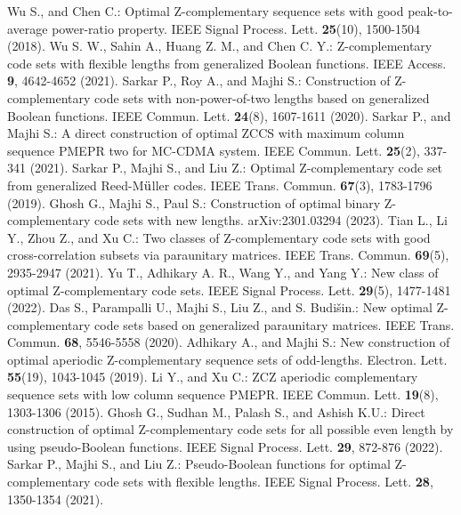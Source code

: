 \documentclass[11pt]{article}
\newcommand{\2} {$2$-to-$1$}
\begin{document}
\begin{thebibliography}{1}
	Wu S.,  and Chen C.:  Optimal Z-complementary sequence sets with good peak-to-average power-ratio property. IEEE Signal Process. Lett. \textbf{25}(10), 1500-1504 (2018).
 Wu S. W., Sahin A., Huang Z. M., and  Chen C. Y.: Z-complementary code sets with flexible lengths from generalized Boolean functions. IEEE Access. \textbf{9},  4642-4652 (2021).
	Sarkar P., Roy A., and Majhi S.: Construction of Z-complementary code sets with non-power-of-two lengths based on generalized Boolean functions. IEEE Commun. Lett. \textbf{24}(8), 1607-1611 (2020).
	Sarkar P.,  and Majhi S.: A direct construction of optimal ZCCS with maximum column sequence PMEPR two for MC-CDMA system. IEEE Commun. Lett.  \textbf{25}(2),  337-341 (2021).
	Sarkar P., Majhi S.,  and Liu Z.: Optimal Z-complementary code set from generalized Reed-M$\rm\ddot{u}$ller codes. IEEE Trans. Commun. \textbf{67}(3), 1783-1796 (2019).
  Ghosh G., Majhi S., Paul S.: Construction of optimal binary Z-complementary code sets with new lengths.  arXiv:2301.03294 (2023).
 Tian L., Li Y., Zhou Z., and Xu C.:  Two classes of Z-complementary code sets with good cross-correlation subsets via paraunitary matrices. IEEE Trans. Commun.  \textbf{69}(5),  2935-2947  (2021).
 Yu T., Adhikary A. R., Wang Y., and Yang Y.:  New class of optimal Z-complementary code sets. IEEE Signal Process. Lett. \textbf{29}(5),  1477-1481  (2022).
 	Das S., Parampalli U., Majhi S., Liu Z.,  and S. Budi\v{s}in.:  New optimal Z-complementary code sets based on generalized paraunitary matrices. IEEE Trans. Commun.  \textbf{68},  5546-5558 (2020).
 Adhikary A.,  and Majhi S.:  New construction of optimal aperiodic Z-complementary sequence sets of odd-lengths. Electron. Lett. \textbf{55}(19),  1043-1045 (2019).
 Li Y.,  and Xu C.: ZCZ aperiodic complementary sequence sets with low column sequence PMEPR. IEEE Commun. Lett.  \textbf{19}(8), 1303-1306 (2015).
  Ghosh G., Sudhan M., Palash S., and Ashish K.U.: Direct construction of optimal Z-complementary code sets for all possible even length by using pseudo-Boolean functions. IEEE Signal Process. Lett. \textbf{29},  872-876  (2022). 
  Sarkar P., Majhi S., and Liu Z.: Pseudo-Boolean functions for optimal Z-complementary code sets with flexible lengths. IEEE Signal Process. Lett.  \textbf{28}, 1350-1354 (2021).


\end{thebibliography}
\end{document}
